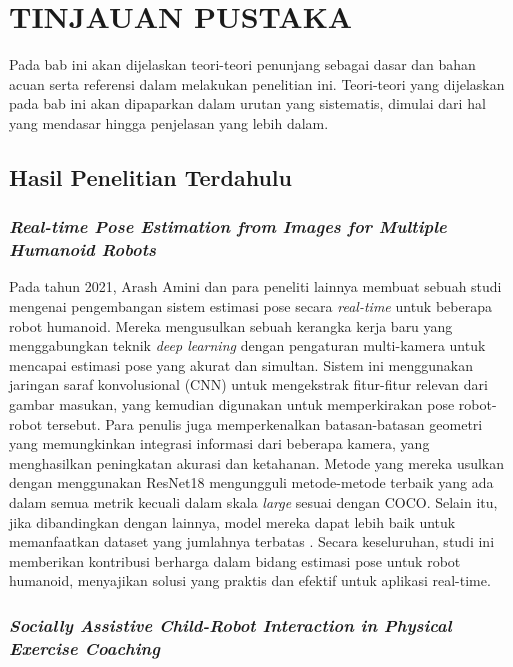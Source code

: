 \chapter{TINJAUAN PUSTAKA}
\label{chap:tinjauan-pustaka}


Pada bab ini akan dijelaskan teori-teori penunjang sebagai dasar dan bahan acuan serta
referensi dalam melakukan penelitian ini. Teori-teori yang dijelaskan pada bab ini akan
dipaparkan dalam urutan yang sistematis, dimulai dari hal yang mendasar hingga penjelasan yang lebih dalam.

\section{Hasil Penelitian Terdahulu}
\label{sec:penelitian-terdahulu}

\subsection{\emph{Real-time Pose Estimation from Images for Multiple Humanoid Robots}}
\label{subsec:real-time-multiple-robots}

Pada tahun 2021, Arash Amini dan para peneliti lainnya membuat sebuah studi mengenai pengembangan sistem estimasi pose secara \emph{real-time} untuk beberapa robot humanoid. Mereka mengusulkan sebuah kerangka kerja baru yang menggabungkan teknik \emph{deep learning} dengan pengaturan multi-kamera untuk mencapai estimasi pose yang akurat dan simultan.
Sistem ini menggunakan jaringan saraf konvolusional (CNN) untuk mengekstrak fitur-fitur relevan dari gambar masukan, yang kemudian digunakan untuk memperkirakan pose robot-robot tersebut.
Para penulis juga memperkenalkan batasan-batasan geometri yang memungkinkan integrasi informasi dari beberapa kamera, yang menghasilkan peningkatan akurasi dan ketahanan.
Metode yang mereka usulkan dengan menggunakan ResNet18 mengungguli metode-metode terbaik yang ada dalam semua metrik kecuali dalam skala \emph{large} sesuai dengan COCO.
Selain itu, jika dibandingkan dengan lainnya, model mereka dapat lebih baik untuk memanfaatkan dataset yang jumlahnya terbatas \parencite{amini2021}. 
Secara keseluruhan, studi ini memberikan kontribusi berharga dalam bidang estimasi pose untuk robot humanoid, menyajikan solusi yang praktis dan efektif untuk aplikasi real-time.

\subsection{\emph{Socially Assistive Child-Robot Interaction in Physical Exercise Coaching}}
\label{subsec:sars-for-child}

